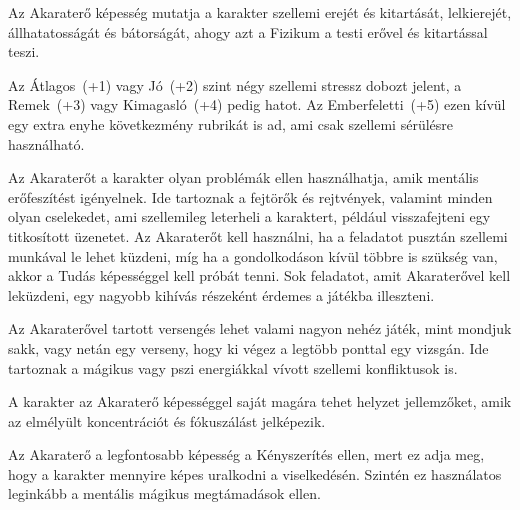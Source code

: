 
Az Akaraterő képesség mutatja a karakter szellemi erejét és kitartását, lelkierejét, állhatatosságát és bátorságát, ahogy azt a Fizikum a testi erővel és kitartással teszi.

Az Átlagos~(+1) vagy Jó~(+2) szint négy szellemi stressz dobozt jelent, a Remek~(+3) vagy Kimagasló~(+4) pedig hatot. Az Emberfeletti~(+5) ezen kívül egy extra enyhe következmény rubrikát is ad, ami csak szellemi sérülésre használható.

\overcome Az Akaraterőt a karakter olyan problémák ellen használhatja, amik mentális erőfeszítést igényelnek. Ide tartoznak a fejtörők és rejtvények, valamint minden olyan cselekedet, ami szellemileg leterheli a karaktert, például visszafejteni egy titkosított üzenetet. Az Akaraterőt kell használni, ha a feladatot pusztán szellemi munkával le lehet küzdeni, míg ha a gondolkodáson kívül többre is szükség van, akkor a Tudás képességgel kell próbát tenni. Sok feladatot, amit Akaraterővel kell leküzdeni, egy nagyobb kihívás részeként érdemes a játékba illeszteni.

Az Akaraterővel tartott versengés lehet valami nagyon nehéz játék, mint mondjuk sakk, vagy netán egy verseny, hogy ki végez a legtöbb ponttal egy vizsgán. Ide tartoznak a mágikus vagy pszi energiákkal vívott szellemi konfliktusok is.

\advantage A karakter az Akaraterő képességgel saját magára tehet helyzet jellemzőket, amik az elmélyült koncentrációt és fókuszálást jelképezik.

\noattack

 Az Akaraterő a legfontosabb képesség a Kényszerítés ellen, mert ez adja meg, hogy a karakter mennyire képes uralkodni a viselkedésén. Szintén ez használatos leginkább a mentális mágikus megtámadások ellen.



